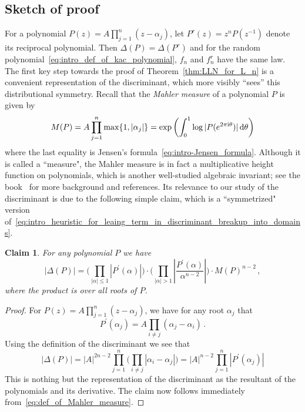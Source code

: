 \documentclass[11pt]{amsart}
\newtheorem{claim}[theorem]{Claim}
\theoremstyle{remark}
\theoremstyle{definition}
\newcommand{\dd}{{\rm d}}
\newcommand{\I}{{\rm i}}
\newcommand{\disc}{\Delta}
\begin{document}
    \subsection{Sketch of proof}
    \label{subsection:sketch_of_proof}
    For a polynomial $P(z) = A\prod_{j=1}^{n}(z-\alpha_j)$, let $P^r(z) = z^{n} P(z^{-1})$ denote its reciprocal polynomial. Then $\disc(P) = \disc(P^r)$ and for the random polynomial~\eqref{eq:intro_def_of_kac_polynomial}, $f_n$ and $f_n^r$ have the same law. The first key step towards the proof of Theorem~\ref{thm:LLN_for_L_n} is a convenient representation of the discriminant, which more visibly ``sees'' this distributional symmetry. Recall that the \emph{Mahler measure} of a polynomial $P$ is given by
	\begin{equation}
		\label{eq:def_of_Mahler_measure}
		M(P) = A \prod_{j=1}^n \max\{1,|\alpha_j|\}  = \exp\left(\int_{0}^{1} \log|P(e^{ 2\pi \I \theta})| \, \dd \theta\right)
	\end{equation}
	where the last equality is Jensen's formula~\eqref{eq:intro-Jensen_formula}.  Although it is called a ``measure", the Mahler measure is in fact a multiplicative height function on polynomials, which is another well-studied algebraic invariant; see the book~\cite{McKee-Smyth} for more background and references. Its relevance to our study of the discriminant is due to the following simple claim, which is a ``symmetrized" version of~\eqref{eq:intro_heuristic_for_leaing_term_in_discriminant_breakup_into_domains}. 
	\begin{claim}
	\label{claim:convenient_formula_for_disc}
		 For any polynomial $P$ we have
		 \[
		 |\disc(P)| = \Big(\prod_{|\alpha|\le 1}|P^\prime(\alpha)| \Big) \cdot \Big(\prod_{|\alpha|>1} \left|\frac{P^\prime(\alpha)}{\alpha^{n-2}}\right| \Big) \cdot M(P)^{n-2}  \, ,
		 \]
         where the product is over all roots of $P$.
	\end{claim}
	\begin{proof}
		For $P(z) = A\prod_{j=1}^n (z-\alpha_j)$, we have for any root $\alpha_j$ that
		\[
		P^\prime(\alpha_j) = A\prod_{i\not= j} (\alpha_j-\alpha_i) \, .
		\]
		Using the definition of the discriminant we see that
		\begin{equation*}
			|\disc(P)| = |A|^{2n-2} \prod_{j=1}^n \Big(\prod_{i\not=j} |\alpha_i-\alpha_j|\Big) = |A|^{n-2} \prod_{j=1}^{n} |P^\prime(\alpha_j)|
		\end{equation*}
		This is nothing but the representation of the discriminant as the resultant of the polynomials and its derivative. The claim now follows immediately from~\eqref{eq:def_of_Mahler_measure}.
	\end{proof}
    
\end{document}
